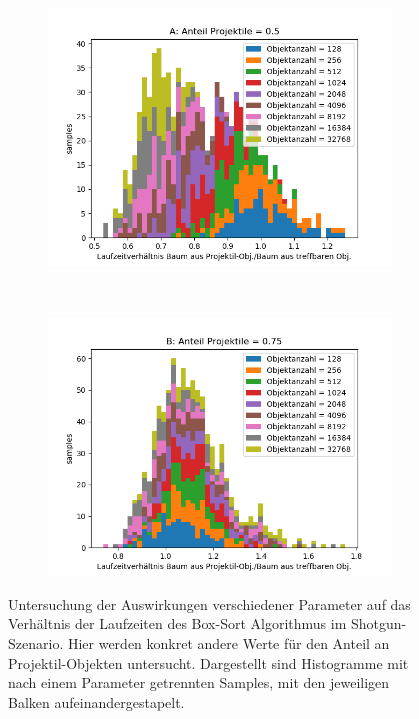 \begin{figure}

	\begin{subfigure}[t]{0.55\textwidth}
		\centering
		\includegraphics[width=1\textwidth]{./res/boxsortChoice-shotgun-F.png}
		
		\label{fig:boxsortChoice-shotgun-F}
	\end{subfigure}
~
	\begin{subfigure}[t]{0.55\textwidth}
		\centering
		\includegraphics[width=1\textwidth]{./res/boxsortChoice-shotgun-G.png}

		\label{fig:boxsortChoice-shotgun-G}
	\end{subfigure}

	\caption{Untersuchung der Auswirkungen verschiedener Parameter auf das Verhältnis der Laufzeiten des Box-Sort Algorithmus im Shotgun-Szenario. Hier werden konkret andere Werte für den Anteil an Projektil-Objekten untersucht. Dargestellt sind Histogramme mit nach einem Parameter getrennten Samples, mit den jeweiligen Balken aufeinandergestapelt.}
	\label{fig:boxsortChoice-shotgun2}
\end{figure}

